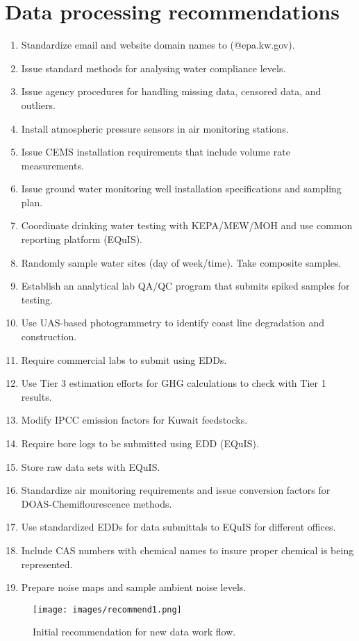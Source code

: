 \section{Data processing recommendations}
\begin{enumerate}
\item Standardize email and website domain names to (@epa.kw.gov). 
\item Issue standard methods for analysing water compliance levels.
\item Issue agency procedures for handling missing data, censored data, and outliers.
\item Install atmospheric pressure sensors in air monitoring stations.
\item Issue CEMS installation requirements that include volume rate measurements.
\item Issue ground water monitoring well installation specifications and sampling plan.
\item Coordinate drinking water testing with KEPA/MEW/MOH and use common reporting platform (EQuIS).
\item Randomly sample water sites (day of week/time). Take composite samples.
\item Establish an analytical lab QA/QC program that submits spiked samples for testing.
\item Use UAS-based photogrammetry to identify coast line degradation and construction.
\item Require commercial labs to submit using EDDs.
\item Use Tier 3 estimation efforts for GHG calculations to check with Tier 1 results.
\item Modify IPCC emission factors for Kuwait feedstocks.
\item Require bore logs to be submitted using EDD (EQuIS).
\item Store raw data sets with EQuIS.
\item Standardize air monitoring requirements and issue conversion factors for DOAS-Chemiflourescence methods.
\item Use standardized EDDs for data submittals to EQuIS for different offices.
\item 	Include CAS numbers with chemical names to insure proper chemical is being represented.
\item 	Prepare noise maps and sample ambient noise levels.
\end{enumerate}

\begin{figure}[H]
\centering
\texttt{[image: images/recommend1.png]} 
\caption{Initial recommendation for new data work flow.}
\label{fig:recommend1}
\end{figure}


